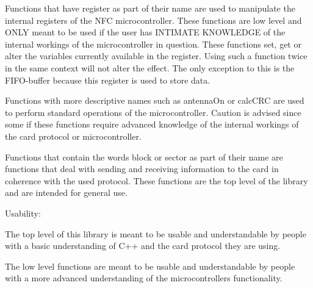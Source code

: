 \begin{DoxyItemize}
\item Functions that have \textquotesingle{}register\textquotesingle{} as part of their name are used to manipulate the internal registers of the N\+FC microcontroller. These functions are low level and O\+N\+LY meant to be used if the user has I\+N\+T\+I\+M\+A\+TE K\+N\+O\+W\+L\+E\+D\+GE of the internal workings of the microcontroller in question. These functions set, get or alter the variables currently available in the register. Using such a function twice in the same context will not alter the effect. The only exception to this is the F\+I\+F\+O-\/buffer because this register is used to store data.
\item Functions with more descriptive names such as \textquotesingle{}antenna\+On\textquotesingle{} or \textquotesingle{}calc\+C\+RC\textquotesingle{} are used to perform standard operations of the microcontroller. Caution is advised since some if these functions require advanced knowledge of the internal workings of the card protocol or microcontroller.
\item Functions that contain the words \textquotesingle{}block\textquotesingle{} or \textquotesingle{}sector\textquotesingle{} as part of their name are functions that deal with sending and receiving information to the card in coherence with the used protocol. These functions are the top level of the library and are intended for general use.
\end{DoxyItemize}

Usability\+:


\begin{DoxyItemize}
\item The top level of this library is meant to be usable and understandable by people with a basic understanding of C++ and the card protocol they are using.
\item The low level functions are meant to be usable and understandable by people with a more advanced understanding of the microcontrollers functionality. 
\end{DoxyItemize}